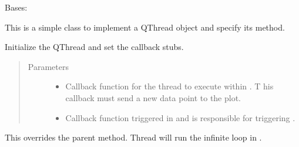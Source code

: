 \documentclass[letterpaper,10pt,english]{sphinxmanual}
\begin{document}
\begin{fulllineitems}
\label{\detokenize{plotGUI:plotGUI.MyThread}}
Bases: 

This is a simple class to implement a QThread object and specify its  method.

\begin{fulllineitems}
\label{\detokenize{plotGUI:plotGUI.MyThread.__init__}}
Initialize the QThread and set the callback stubs.
\begin{quote}\begin{description}
\item[{Parameters}] \leavevmode\begin{itemize}
\item {} 
 \textendash{} Callback function for the thread to execute within . T
his callback must send a new data point to the plot.

\item {} 
 \textendash{} Callback function triggered in 
and is responsible for triggering .

\end{itemize}

\end{description}\end{quote}

\end{fulllineitems}


\begin{fulllineitems}
\label{\detokenize{plotGUI:plotGUI.MyThread.run}}
This overrides the parent  method. Thread will run the infinite loop in .

\end{fulllineitems}


\end{fulllineitems}
\end{document}
